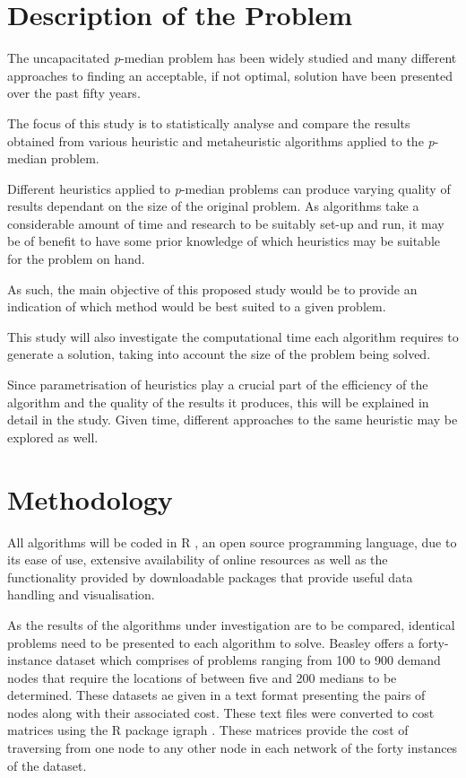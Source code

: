 \documentclass[11pt]{article}
\begin{document}
	
	\section{Description of the Problem}
	The uncapacitated \emph{p}-median problem has been widely studied and many different approaches to finding an acceptable, if not optimal, solution have been presented over the past fifty years.
	
	The focus of this study is to statistically analyse and compare the results obtained from various heuristic and metaheuristic algorithms applied to the \emph{p}-median problem.
	
	Different heuristics applied to \emph{p}-median problems can produce varying quality of results dependant on the size of the original problem.  As algorithms take a considerable amount of time and research to be suitably set-up and run, it may be of benefit to have some prior knowledge of which heuristics may be suitable for the problem on hand.
	
	As such, the main objective of this proposed study would be to provide an indication of which method would be best suited to a given problem.
	
	This study will also investigate the computational time each algorithm requires to generate a solution, taking into account the size of the problem being solved.
	
	Since parametrisation of heuristics play a crucial part of the efficiency of the algorithm and the quality of the results it produces, this will be explained in detail in the study.  Given time, different approaches to the same heuristic may be explored as well.	
	
	
	\section{Methodology}
	All algorithms will be coded in R \cite{RPROGRAMME}, an open source programming language, due to its ease of use, extensive availability of online resources as well as the functionality provided by downloadable packages that provide useful data handling and visualisation.
	
	As the results of the algorithms under investigation are to be compared, identical problems need to be presented to each algorithm to solve.  Beasley \cite{BEAS90}  offers a forty-instance dataset which comprises of problems ranging from 100 to 900 demand nodes that require the locations of between five and 200 medians to be determined.  These datasets ae given in a text format presenting the pairs of nodes along with their associated cost.  These text files were converted to cost matrices using the R package igraph \cite{RIGRAPH}.  These matrices provide the cost of traversing from one node to any other node in each network of the forty instances of the dataset.
	
\end{document}
